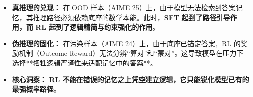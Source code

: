 \documentclass[11pt, a4paper]{article} %
\begin{document}
\begin{tcolorbox}[enhanced, colback=green!5!white, colframe=green!50!black, title=科研结论：RL 的效用边界]
	\small
	\begin{itemize}
		\item \textbf{真推理的兑现：} 在 OOD 样本（AIME 25）上，由于模型无法检索到答案记忆，其推理路径必须依赖底座的数学本能。此时，\textbf{SFT 起到了路径引导作用，而 RL 起到了逻辑精简与约束强化的作用}。
		\item \textbf{伪推理的固化：} 在污染样本（AIME 24）上，由于底座已锚定答案，RL 的奖励机制（Outcome Reward）无法分辨“算对”和“蒙对”。这导致模型在压力下选择**牺牲逻辑严谨性来适配记忆中的答案**。
		\item \textbf{核心洞察：} \textbf{RL 不能在错误的记忆之上凭空建立逻辑，它只能锐化模型已有的最强概率路径}。
	\end{itemize}
\end{tcolorbox}
\end{document}
